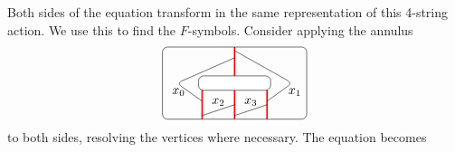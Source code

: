 Both sides of the equation transform in the same representation of this 4-string action. We use this to find the $F$-symbols. Consider applying the annulus
\begin{equation}
\begin{tikzpicture}[scale=1,baseline=(current bounding box.center)]
\draw[red,line width=0.4mm](-.9,0)--(-.9,-1);
\draw[red,line width=0.4mm](0,0)--(0,-1);\draw[red,line width=0.4mm](0,.2)--(0,1);
\draw[red,line width=0.4mm](.9,0)--(.9,-1);
\draw[rounded corners] (0,.7)--(-1.6,0)--(-.9,-.5)node[pos=.5,left]{$x_0$};
\draw[rounded corners] (0,.9)--(1.6,0)--(.9,-.5)node[pos=.5,right]{$\ x_1$};
\draw[rounded corners] (-.9,-.9)--(0,-.6)node[pos=.5,above]{$x_2$};
\draw[rounded corners] (0,-.9)--(.9,-.6)node[pos=.5,above]{$x_3$};
\draw[rounded corners] (-2,-1) rectangle (2,1);
\filldraw[fill=white,rounded corners] (-1,-.2) rectangle (1,.2);
\end{tikzpicture}\label{eqn:Ftransform}
\end{equation}
to both sides, resolving the vertices where necessary. The equation becomes
